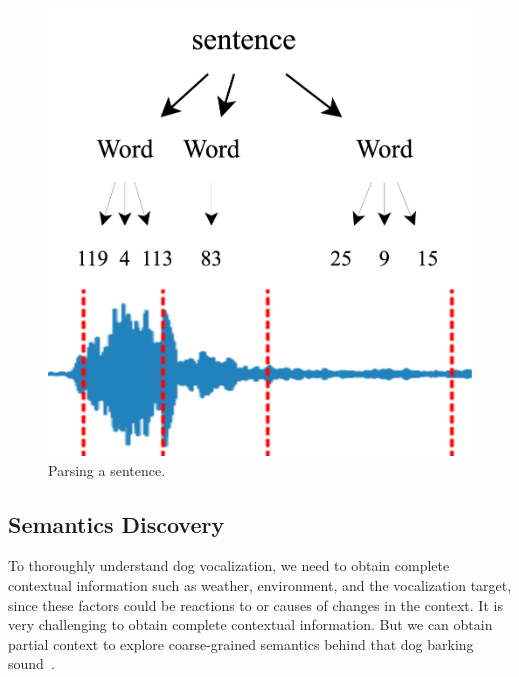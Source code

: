 \begin{figure}[th]
    \centering
    \includegraphics[width=0.6\columnwidth]{parse.png}
    \caption{Parsing a sentence.}
    \label{fig:parse}
\end{figure}

\subsection{Semantics Discovery}
To thoroughly understand dog vocalization, we need to obtain complete contextual information
such as weather, environment, and the vocalization target,
since these factors could be reactions to or causes of changes in the context.
It is very challenging to obtain complete contextual information.
But we can obtain partial context to explore coarse-grained semantics behind that dog barking sound~\citep{berthet2023animal}.


